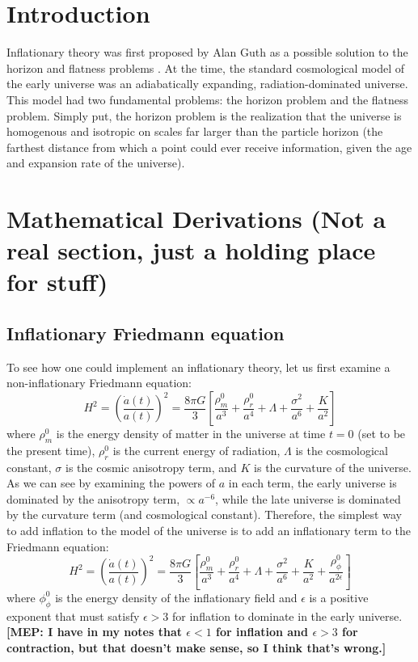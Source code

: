 \documentclass[onecolumn,apj]{emulateapj}
\newcommand{\mep}[1]{{\color{applegreen} \textbf{[MEP:  #1]}}}
\begin{document}
\section{Introduction}
Inflationary theory was first proposed by Alan Guth as a possible solution to the horizon and flatness problems \citep{Guth1981}. At the time, the standard cosmological model of the early universe was an adiabatically expanding, radiation-dominated universe. This model had two fundamental problems: the horizon problem and the flatness problem. Simply put, the horizon problem is the realization that the universe is homogenous and isotropic on scales far larger than the particle horizon (the farthest distance from which a point could ever receive information, given the age and expansion rate of the universe). 

\section{Mathematical Derivations (Not a real section, just a holding place for stuff)}
\subsection{Inflationary Friedmann equation}
To see how one could implement an inflationary theory, let us first examine a non-inflationary Friedmann equation:
\begin{equation}
H^2 = \left ( \frac{\dot a(t)}{a(t)} \right ) ^2 = \frac{8 \pi G}{3} \left [ \frac{\rho^0_m}{a^3} + \frac{\rho^0_r}{a^4} + \Lambda + \frac{\sigma^2}{a^6} + \frac{K}{a^2} \right ]
\end{equation}
where $\rho^0_m$ is the energy density of matter in the universe at time $t=0$ (set to be the present time), $\rho^0_r$ is the current energy of radiation, $\Lambda$ is the cosmological constant, $\sigma$ is the cosmic anisotropy term, and $K$ is the curvature of the universe. As we can see by examining the powers of $a$ in each term, the early universe is dominated by the anisotropy term, $\propto a^{-6}$, while the late universe is dominated by the curvature term (and cosmological constant). Therefore, the simplest way to add inflation to the model of the universe is to add an inflationary term to the Friedmann equation: 
\begin{equation}
H^2 = \left ( \frac{\dot a(t)}{a(t)} \right ) ^2 = \frac{8 \pi G}{3} \left [ \frac{\rho^0_m}{a^3} + \frac{\rho^0_r}{a^4} + \Lambda + \frac{\sigma^2}{a^6} + \frac{K}{a^2} + \frac{\rho^0_\phi}{a^{2\epsilon}} \right ]
\end{equation}
where $\phi^0_\phi$ is the energy density of the inflationary field and $\epsilon$ is a positive exponent that must satisfy $\epsilon>3$ for inflation to dominate in the early universe. \mep{I have in my notes that $\epsilon<1$ for inflation and $\epsilon>3$ for contraction, but that doesn't make sense, so I think that's wrong.} 
\end{document}
